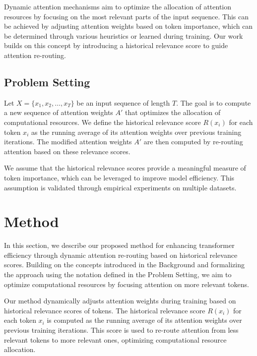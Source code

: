 \documentclass{article} %
\begin{document}
Dynamic attention mechanisms aim to optimize the allocation of attention resources by focusing on the most relevant parts of the input sequence. This can be achieved by adjusting attention weights based on token importance, which can be determined through various heuristics or learned during training. Our work builds on this concept by introducing a historical relevance score to guide attention re-routing.

\subsection{Problem Setting}
\label{sec:problem_setting}

Let \( X = \{x_1, x_2, \ldots, x_T\} \) be an input sequence of length \( T \). The goal is to compute a new sequence of attention weights \( A' \) that optimizes the allocation of computational resources. We define the historical relevance score \( R(x_i) \) for each token \( x_i \) as the running average of its attention weights over previous training iterations. The modified attention weights \( A' \) are then computed by re-routing attention based on these relevance scores.

We assume that the historical relevance scores provide a meaningful measure of token importance, which can be leveraged to improve model efficiency. This assumption is validated through empirical experiments on multiple datasets.

\section{Method}
\label{sec:method}

In this section, we describe our proposed method for enhancing transformer efficiency through dynamic attention re-routing based on historical relevance scores. Building on the concepts introduced in the Background and formalizing the approach using the notation defined in the Problem Setting, we aim to optimize computational resources by focusing attention on more relevant tokens.

Our method dynamically adjusts attention weights during training based on historical relevance scores of tokens. The historical relevance score \( R(x_i) \) for each token \( x_i \) is computed as the running average of its attention weights over previous training iterations. This score is used to re-route attention from less relevant tokens to more relevant ones, optimizing computational resource allocation.
\end{document}
